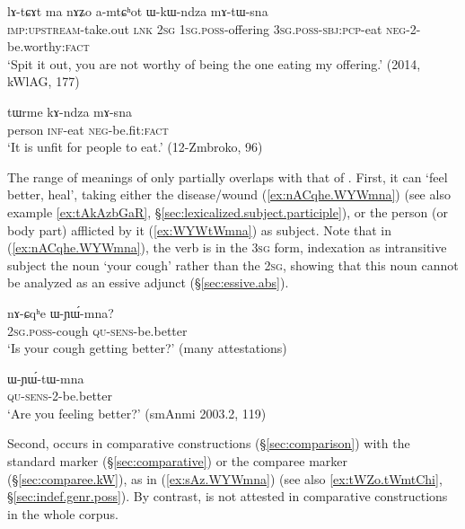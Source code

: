 \begin{exe}
\ex \label{ex:WkWndza.mAtWsna}
\gll lɤ-tɕɤt ma nɤʑo a-mtɕʰot ɯ-kɯ-ndza mɤ-tɯ-sna \\
\textsc{imp}:\textsc{upstream}-take.out \textsc{lnk} \textsc{2sg} \textsc{1sg}.\textsc{poss}-offering \textsc{3sg}.\textsc{poss}-\textsc{sbj}:\textsc{pcp}-eat \textsc{neg}-2-be.worthy:\textsc{fact} \\
\glt `Spit it out, you are not worthy of being the one eating my offering.' (2014, kWlAG, 177)
\end{exe}

\begin{exe}
\ex \label{ex:kAndza.mAsna}
\gll tɯrme kɤ-ndza mɤ-sna\\
person \textsc{inf}-eat \textsc{neg}-be.fit:\textsc{fact} \\
\glt `It is unfit for people to eat.' (12-Zmbroko, 96)
\end{exe}

The range of meanings of  only partially overlaps with that of . First, it can `feel better, heal', taking either the disease/wound (\ref{ex:nACqhe.WYWmna}) (see also example \ref{ex:tAkAzbGaR}, §\ref{sec:lexicalized.subject.participle}), or the person (or body part) afflicted by it (\ref{ex:WYWtWmna}) as subject. Note that in (\ref{ex:nACqhe.WYWmna}), the verb is in the \textsc{3sg} form, indexation as intransitive subject the noun  `your cough' rather than the \textsc{2sg}, showing that this noun cannot be analyzed as an essive adjunct (§\ref{sec:essive.abs}).

\begin{exe}
\ex \label{ex:nACqhe.WYWmna}
\gll nɤ-ɕqʰe ɯ-ɲɯ́-mna? \\
\textsc{2sg}.\textsc{poss}-cough \textsc{qu}-\textsc{sens}-be.better \\
\glt `Is your cough getting better?' (many attestations)
\end{exe}

\begin{exe}
\ex \label{ex:WYWtWmna}
\gll ɯ-ɲɯ́-tɯ-mna \\
\textsc{qu}-\textsc{sens}-2-be.better \\
\glt `Are you feeling better?' (smAnmi 2003.2, 119)
\end{exe}

Second,  occurs in comparative constructions (§\ref{sec:comparison}) with the standard marker  (§\ref{sec:comparative}) or the comparee marker  (§\ref{sec:comparee.kW}), as in (\ref{ex:sAz.WYWmna}) (see also \ref{ex:tWZo.tWmtChi}, §\ref{sec:indef.genr.poss}). By contrast,  is not attested in comparative constructions in the whole corpus.

